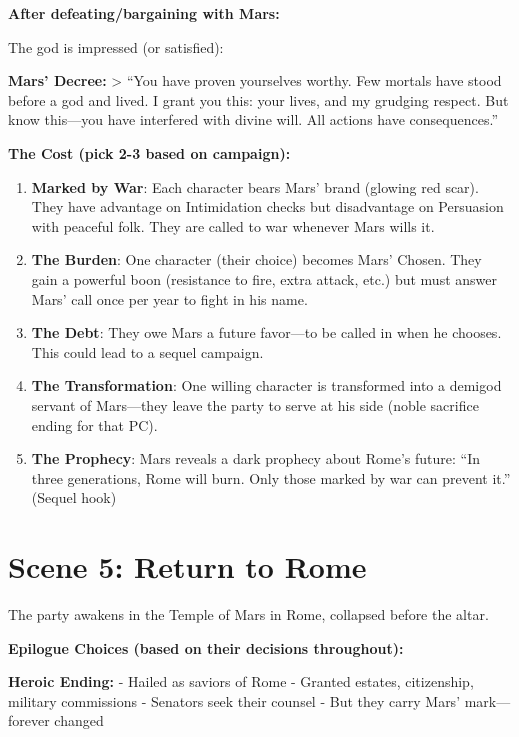 \documentclass[
]{book}
\begin{document}
\textbf{After defeating/bargaining with Mars:}

The god is impressed (or satisfied):

\textbf{Mars' Decree:} \textgreater{} ``You have proven yourselves
worthy. Few mortals have stood before a god and lived. I grant you this:
your lives, and my grudging respect. But know this---you have interfered
with divine will. All actions have consequences.''

\textbf{The Cost (pick 2-3 based on campaign):}

\begin{enumerate}
\def\labelenumi{\arabic{enumi}.}
\item
  \textbf{Marked by War}: Each character bears Mars' brand (glowing red
  scar). They have advantage on Intimidation checks but disadvantage on
  Persuasion with peaceful folk. They are called to war whenever Mars
  wills it.
\item
  \textbf{The Burden}: One character (their choice) becomes Mars'
  Chosen. They gain a powerful boon (resistance to fire, extra attack,
  etc.) but must answer Mars' call once per year to fight in his name.
\item
  \textbf{The Debt}: They owe Mars a future favor---to be called in when
  he chooses. This could lead to a sequel campaign.
\item
  \textbf{The Transformation}: One willing character is transformed into
  a demigod servant of Mars---they leave the party to serve at his side
  (noble sacrifice ending for that PC).
\item
  \textbf{The Prophecy}: Mars reveals a dark prophecy about Rome's
  future: ``In three generations, Rome will burn. Only those marked by
  war can prevent it.'' (Sequel hook)
\end{enumerate}

\section{Scene 5: Return to Rome}\label{scene-5-return-to-rome}

The party awakens in the Temple of Mars in Rome, collapsed before the
altar.

\textbf{Epilogue Choices (based on their decisions throughout):}

\textbf{Heroic Ending:} - Hailed as saviors of Rome - Granted estates,
citizenship, military commissions - Senators seek their counsel - But
they carry Mars' mark---forever changed
\end{document}
